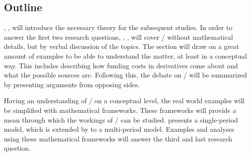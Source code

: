 \documentclass[main.tex]{subfiles}
\begin{document}
    \subsection{Outline}

    , , 
    will introduce the necessary theory for the subsequent studies.
    In order to answer the first two research questions,
    , , 
    will cover \FVA/ without mathematical details, but by verbal discussion of the topics.
    The section will draw on a great amount of examples to be able to understand the matter, 
    at least in a conceptual way.
    This includes describing how funding costs in derivatives come about 
    and what the possible sources are.
    Following this, the debate on \FVA/ will be summarized
    by presenting arguments from opposing sides.

    Having an understanding of \FVA/ on a conceptual level,
    the real world examples will be simplified with mathematical frameworks.
    These frameworks will provide a mean through which the workings of \FVA/ can be studied.
     presents a single-period model,
    which is extended by  to a multi-period model.
    Examples and analyses using these mathematical frameworks
    will answer the third and last research question.
\end{document}
